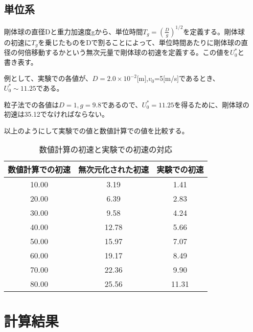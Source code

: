 \documentclass[]{jsarticle}
\begin{document}
\subsection{単位系}
剛体球の直径Dと重力加速度gから、単位時間$T_g=\left(\frac{D}{g}\right)^{1/2}$を定義する。剛体球の初速に$T_g$を乗じたものをDで割ることによって、単位時間あたりに剛体球の直径の何倍移動するかという無次元量で剛体球の初速を定義する。この値を$U_0^*$と書き表す。

例として、実験での各値が、$D=2.0\times10^{-2}$[m],$v_0$=5[m/s]であるとき、$U_0^*\sim11.25$である。

粒子法での各値は$D=1, g=9.8$であるので、$U_0^*=11.25$を得るために、剛体球の初速は35.12でなければならない。

以上のようにして実験での値と数値計算での値を比較する。
\begin{table}[h]
  \caption{数値計算の初速と実験での初速の対応}
  \label{tab:velocity_non_dim}
  \begin{center}
    \begin{tabular}{|c|c|c|}\hline
      数値計算での初速&無次元化された初速&実験での初速 \\ \hline
      10.00 & 3.19 & 1.41 \\ \hline
      20.00 & 6.39 & 2.83 \\ \hline
      30.00 & 9.58 & 4.24 \\ \hline
      40.00 & 12.78 & 5.66 \\ \hline
      50.00 & 15.97 & 7.07 \\ \hline
      60.00 & 19.17 & 8.49 \\ \hline
      70.00 & 22.36 & 9.90 \\ \hline
      80.00 & 25.56 & 11.31 \\ \hline
    \end{tabular}
  \end{center}
\end{table}



\newpage
\section{計算結果}
\end{document}
